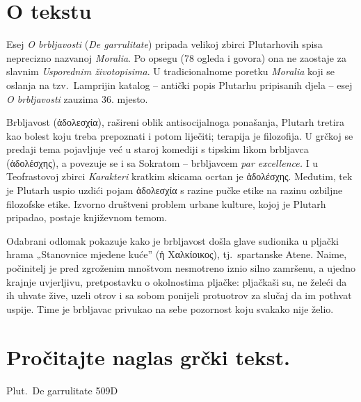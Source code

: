 

\section*{O tekstu}

Esej \textit{O brbljavosti} (\textit{De garrulitate}) pripada velikoj zbirci Plutarhovih spisa neprecizno nazvanoj \textit{Moralia}. Po opsegu (78 ogleda i govora) ona ne zaostaje za slavnim \textit{Usporednim životopisima}. U tradicionalnome poretku \textit{Moralia} koji se oslanja na tzv.\ Lamprijin katalog – antički popis Plutarhu pripisanih djela – esej \textit{O brbljavosti} zauzima 36. mjesto. 

Brbljavost \textgreek[variant=ancient]{(ἀδολεσχία),} rašireni oblik antisocijalnoga ponašanja, Plutarh tretira kao bolest koju treba prepoznati i potom liječiti; terapija je filozofija. U grčkoj se predaji tema pojavljuje već u staroj komediji s tipskim likom brbljavca \textgreek[variant=ancient]{(ἀδολέσχης)}, a povezuje se i sa Sokratom – brbljavcem \textit{par excellence.} I u Teofrastovoj zbirci \textit{Karakteri} kratkim skicama ocrtan je \textgreek[variant=ancient]{ἀδολέσχης.} Međutim, tek je Plutarh uspio uzdići pojam \textgreek[variant=ancient]{ἀδολεσχία} s razine pučke etike na razinu ozbiljne filozofske etike. Izvorno društveni problem urbane kulture, kojoj je Plutarh pripadao, postaje književnom temom.

Odabrani odlomak pokazuje kako je brbljavost došla glave sudionika u pljački hrama „Stanovnice mjedene kuće'' \textgreek[variant=ancient]{(ἡ Χαλκίοικος),} tj.\ spartanske Atene. Naime, počinitelj je pred zgroženim mnoštvom nesmotreno iznio silno zamršenu, a ujedno krajnje uvjerljivu, pretpostavku o okolnostima pljačke: pljačkaši su, ne želeći da ih uhvate žive, uzeli otrov i sa sobom ponijeli protuotrov za slučaj da im pothvat uspije. Time je brbljavac privukao na sebe pozornost koju svakako nije želio.


\section*{Pročitajte naglas grčki tekst.}

Plut.\ De garrulitate 509D


\medskip


